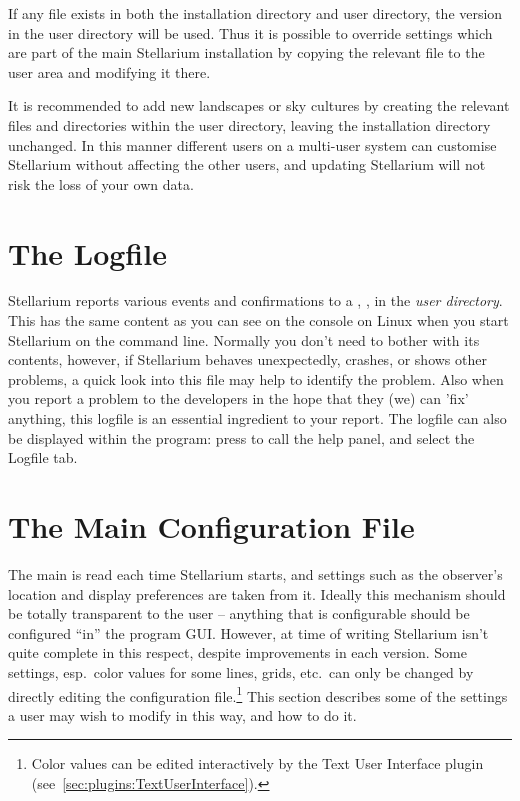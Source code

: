 If any file exists in both the installation directory and user
directory, the version in the user directory will be used. Thus it is
possible to override settings which are part of the main Stellarium
installation by copying the relevant file to the user area and modifying
it there.

It is recommended to add new landscapes or sky cultures by creating the relevant files
and directories within the user directory, leaving the installation
directory unchanged. In this manner different users on a multi-user
system can customise Stellarium without affecting the other users, and 
updating Stellarium will not risk the loss of your own data. 


\section{The Logfile}
\label{sec:LogFile}

Stellarium reports various events and confirmations to a , , 
in the \emph{user directory}. This has the same content as you can see on the console 
on Linux when you start Stellarium on the command line. Normally you don't need to bother with its contents, 
however, if Stellarium behaves unexpectedly, crashes, or shows other problems, a quick look into this 
file may help to identify the problem. Also when you report a problem to the developers in the hope 
that they (we) can 'fix' anything, this logfile is an essential ingredient to your report. 
The logfile can also be displayed within the program: press  to call the help panel, and select the Logfile tab. 


\section{The Main Configuration File}
\label{sec:ConfigurationFile}

The main  is read each time Stellarium starts, and
settings such as the observer's location and display preferences are
taken from it. Ideally this mechanism should be totally transparent to
the user -- anything that is configurable should be configured ``in''
the program GUI. However, at time of writing Stellarium isn't quite
complete in this respect, despite improvements in each version. Some
settings, esp.\ color values for some lines, grids, etc.\ can only be
changed by directly editing the configuration file.\footnote{Color
  values can be edited interactively by the Text User Interface plugin
  (see~\ref{sec:plugins:TextUserInterface}).} This section describes
some of the settings a user may wish to modify in this way, and how to
do it.


